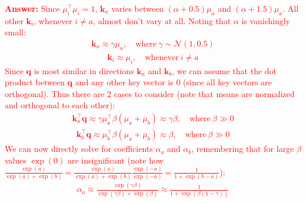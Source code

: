 \documentclass[letterpaper,12pt]{article}
\begin{document}
\begin{itemize}
		\textcolor{red}{\textbf{Answer:} Since $\mu_i^\top\mu_i = 1$, $\mathbf{k}_a$ varies between $(\alpha + 0.5)\mu_a$ and $(\alpha + 1.5)\mu_a$. All other $\mathbf{k}_i$, whenever $i \neq a$, almost don't vary at all. Noting that $\alpha$ is vanishingly small:
		\begin{equation*}
			\begin{aligned}
				\mathbf{k}_a \approx \gamma \mu_a, \quad \text{where} \ \gamma \sim \mathcal{N}(1,0.5)
			\end{aligned}
		\end{equation*}
		\begin{equation*}
			\begin{aligned}
				\mathbf{k}_i \approx \mu_i, \quad \text{whenever} \ i \neq a
			\end{aligned}
		\end{equation*}
		Since $\mathbf{q}$ is most similar in directions $\mathbf{k}_a$ and $\mathbf{k}_b$, we can assume that the dot product between $\mathbf{q}$ and any other key vector is 0 (since all key vectors are orthogonal). Thus there are 2 cases to consider (note that means are normalized and orthogonal to each other):
		\begin{equation*}
			\begin{aligned}
				\mathbf{k}_a^\top \mathbf{q} \approx \gamma \mu_a^\top \beta \left( \mu_a + \mu_b \right) \approx \gamma \beta, \quad \text{where} \ \beta \gg 0
			\end{aligned}
		\end{equation*}
		\begin{equation*}
			\begin{aligned}
				\mathbf{k}_b^\top \mathbf{q} \approx \mu_b^\top \beta \left( \mu_a + \mu_b \right) \approx \beta, \quad \text{where} \ \beta \gg 0
			\end{aligned}
		\end{equation*}
		We can now directly solve for coefficients $\alpha_a$ and $\alpha_b$, remembering that for large $\beta$ values $\exp(0)$ are insignificant (note how $\frac{\exp(a)}{\exp(a)+\exp(b)} = \frac{\exp(a)}{\exp(a)+\exp(b)}\frac{\exp(-a)}{\exp(-a)}=\frac{1}{1+\exp(b-a)}$):
		\begin{equation*}
			\begin{aligned}
				\alpha_a \approx \frac{\exp(\gamma \beta)}{\exp(\gamma \beta) + \exp(\beta)} \approx \frac{1}{1+\exp(\beta(1-\gamma))}
			\end{aligned}
		\end{equation*}
		\begin{equation*}

\end{equation*}}
\end{itemize}
\end{document}

